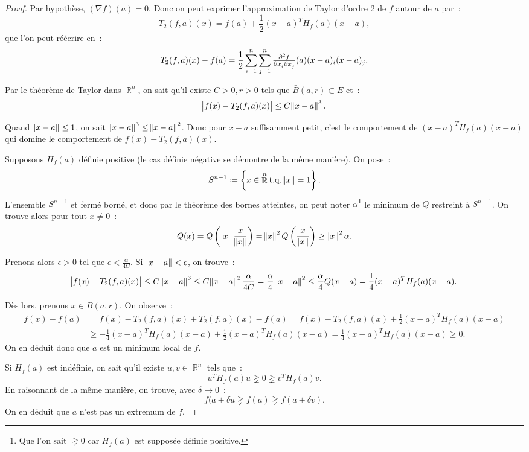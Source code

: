 \documentclass{article}
\DeclareMathOperator{\R}{\mathbb R}
\DeclareMathOperator{\tq}{ t.q. }
\theoremstyle{definition}
\theoremstyle{remark}
\begin{document}
		\begin{proof} Par hypothèse, $(\nabla f)(a) = 0$. Donc on peut exprimer l'approximation de Taylor d'ordre 2 de $f$ autour de $a$ par~:
		\[T_2(f, a)(x) = f(a) + \frac 12(x-a)^TH_f(a)(x-a),\]
		que l'on peut réécrire en~:
		\[T_2(f, a)(x) - f(a) = \frac 12\sum_{i=1}^n\sum_{j=1}^n\md f2{x_i}{}{x_j}{}(a)(x-a)_i(x-a)_j.\]

		Par le théorème de Taylor dans $\R^n$, on sait qu'il existe $C > 0, r > 0$ tels que $\bar B(a, r) \subset E$ et~:
		\[\abs {f(x)-T_2(f, a)(x)} \leq C\norm{x-a}^3.\]

		Quand $\norm {x-a} \leq 1$, on sait $\norm {x-a}^3 \leq \norm {x-a}^2$. Donc pour $x-a$ suffisamment petit, c'est le comportement de $(x-a)^TH_f(a)(x-a)$
		qui domine le comportement de $f(x)-T_2(f, a)(x)$.

		Supposons $H_f(a)$ définie positive (le cas définie négative se démontre de la même manière). On pose~:
		\[S^{n-1} \coloneqq \left\{x \in \R^n \tq \norm x = 1\right\}.\]
		L'ensemble $S^{n-1}$ et fermé borné, et donc par le théorème des bornes atteintes, on peut noter $\alpha$\footnote{Que l'on sait $\gneqq 0$ car $H_f(a)$
		est supposée définie positive.} le minimum de $Q$ restreint à $S^{n-1}$. On trouve alors pour tout $x \neq 0$~:
		\[Q(x) = Q\left(\norm x\frac x{\norm x}\right) = \norm x^2Q\left(\frac x{\norm x}\right) \geq \norm x^2\alpha.\]

		Prenons alors $\epsilon > 0$ tel que $\epsilon < \frac \alpha{4C}$. Si $\norm {x-a} < \epsilon$, on trouve~:
		\[\abs {f(x)-T_2(f, a)(x)} \leq C\norm{x-a}^3 \leq C\norm{x-a}^2\frac \alpha{4C} = \frac \alpha 4\norm{x-a}^2
		\leq \frac \alpha 4Q(x-a) = \frac 14(x-a)^TH_f(a)(x-a).\]

		Dès lors, prenons $x \in B(a, r)$. On observe~:
		\begin{align*}
			f(x)-f(a) &= f(x) - T_2(f, a)(x) + T_2(f, a)(x) - f(a) = f(x) - T_2(f, a)(x) + \frac 12(x-a)^TH_f(a)(x-a) \\
			&\geq -\frac 14(x-a)^TH_f(a)(x-a) + \frac 12(x-a)^TH_f(a)(x-a) = \frac 14(x-a)^TH_f(a)(x-a) \geq 0.
		\end{align*}
		On en déduit donc que $a$ est un minimum local de $f$.

		Si $H_f(a)$ est indéfinie, on sait qu'il existe $u, v \in \R^n$ tels que~:
		\[u^TH_f(a)u \gneqq 0 \gneqq v^TH_f(a)v.\]
		En raisonnant de la même manière, on trouve, avec $\delta \to 0$~:
		\[f(a + \delta u \gneqq f(a) \gneqq f(a + \delta v).\]
		On en déduit que $a$ n'est pas un extremum de $f$.
		\end{proof}
\end{document}
